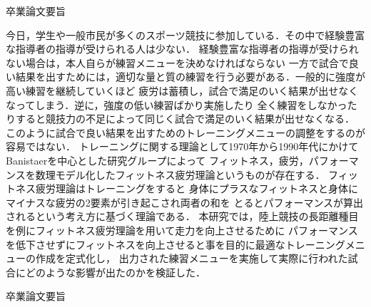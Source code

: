 \documentclass[12pt,fleqn]{jreport}
\begin{document}
\begin{center}
  {\huge 卒業論文要旨}
\end{center}
\vspace{3cm}
\large
今日，学生や一般市民が多くのスポーツ競技に参加している．その中で経験豊富な指導者の指導が受けられる人は少ない．
経験豊富な指導者の指導が受けられない場合は，本人自らが練習メニューを決めなければならない
一方で試合で良い結果を出すためには，適切な量と質の練習を行う必要がある．一般的に強度が高い練習を継続していくほど
疲労は蓄積し，試合で満足のいく結果が出せなくなってしまう．逆に，強度の低い練習ばかり実施したり
全く練習をしなかったりすると競技力の不足によって同じく試合で満足のいく結果が出せなくなる．
このように試合で良い結果を出すためのトレーニングメニューの調整をするのが容易ではない．
トレーニングに関する理論として1970年から1990年代にかけてBanistaerを中心とした研究グループによって
フィットネス，疲労，パフォーマンスを数理モデル化したフィットネス疲労理論というものが存在する\cite{banister}．
フィットネス疲労理論\cite{banister}はトレーニングをすると
身体にプラスなフィットネスと身体にマイナスな疲労の2要素が引き起こされ両者の和を
とるとパフォーマンスが算出されるという考え方に基づく理論である．
本研究では，陸上競技の長距離種目を例にフィットネス疲労理論\cite{banister}を用いて走力を向上させるために
パフォーマンスを低下させずにフィットネスを向上させると事を目的に最適なトレーニングメニューの作成を定式化し，
出力された練習メニューを実施して実際に行われた試合にどのような影響が出たのかを検証した．
\newpage
\thispagestyle{empty}

\begin{center}
  {\huge 卒業論文要旨}
\end{center}
\vspace{3cm}



\newpage
{}   %
\setlength{\baselineskip}{20pt}   %
\tableofcontents   %
\newpage
\listoffigures   %
\listoftables   %
\clearpage   %
\newpage
\end{document}
